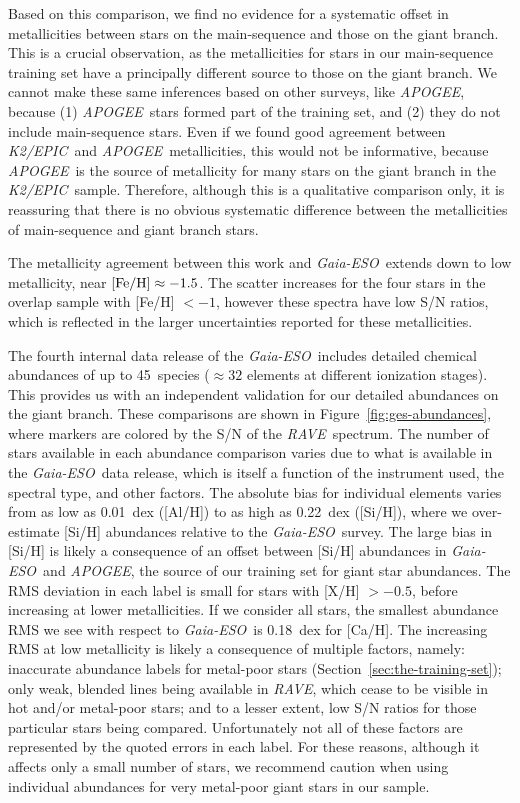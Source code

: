 \documentclass[preprint,trackchanges]{aastex}
\newcommand{\acronym}[1]{{\small{#1}}}
\newcommand{\project}[1]{\textsl{#1}}
\newcommand{\rave}{\project{\acronym{RAVE}}}
\newcommand{\ges}{\project{Gaia-ESO}}
\newcommand{\apogee}{\project{\acronym{APOGEE}}}
\newcommand{\epic}{\project{K2/EPIC}}
\begin{document}
Based on this comparison, we find no evidence for a systematic offset in
metallicities between stars on the main-sequence and those on the giant branch. 
This is a crucial observation, as the metallicities for stars in our 
main-sequence training set have a principally different source to those on 
the giant branch.  We cannot make these same inferences based on other 
surveys, like \apogee, because (1) \apogee\ stars formed part of the 
training set, and (2) they do not include main-sequence stars.  Even if we 
found good agreement between \epic\ and \apogee\ metallicities, this would 
not be informative, because \apogee\ is the source of metallicity for many 
stars on the giant branch in the \epic\ sample. Therefore, although this is
a qualitative comparison only, it is reassuring that there is no obvious 
systematic difference between the metallicities of main-sequence and giant
branch stars.


The metallicity agreement between this work and \ges\ extends down to low
metallicity, near $[{\rm Fe/H}] \approx -1.5$.  The scatter increases for
the four stars in the overlap sample with [Fe/H] $< -1$, however these
spectra have low S/N ratios, which is reflected in the larger uncertainties
reported for these metallicities. 


The fourth internal data release of the \ges\ includes detailed chemical
abundances of up to 45~species ($\approx32$ elements at different ionization
stages).  This provides us with an independent validation for our detailed
abundances on the giant branch.  These comparisons are shown in 
Figure~\ref{fig:ges-abundances}, where markers are colored by the
S/N of the \rave\ spectrum.  The number of stars available in each abundance
comparison varies due to what is available in the \ges\ data release, which
is itself a function of the instrument used, the spectral type, and other
factors.  The absolute bias for individual elements varies from as low as
0.01~dex ([Al/H]) to as high as 0.22~dex ([Si/H]), where we over-estimate 
[Si/H] abundances relative to the \ges\ survey.  The large bias in [Si/H]
is likely a consequence of an offset between [Si/H] abundances in \ges\ and
\apogee, the source of our training set for giant star abundances.  
The RMS deviation in each
label is small for stars with [X/H] $> -0.5$, before increasing at lower
metallicities.  If we consider all stars, the smallest abundance RMS we see
with respect to \ges\ is 0.18~dex for [Ca/H].  The increasing RMS at low 
metallicity is likely a consequence of multiple factors, namely: inaccurate
abundance labels for metal-poor stars (Section~\ref{sec:the-training-set});
only weak, blended lines being available in \rave, which cease to be visible
in hot and/or metal-poor stars; and to a lesser extent, low S/N ratios for 
those particular stars being compared.  Unfortunately not all of these
factors are represented by the quoted errors in each label.  For these reasons, 
although it affects only a small number of stars, we recommend caution when 
using individual abundances for very metal-poor giant stars in our sample.
\end{document}
